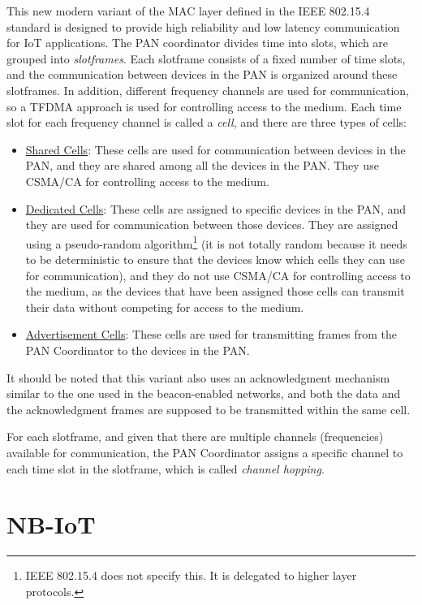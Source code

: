 This new modern variant of the MAC layer defined in the IEEE 802.15.4 standard is designed to provide high reliability and low latency communication for IoT applications. The PAN coordinator divides time into slots, which are grouped into \emph{slotframes}. Each slotframe consists of a fixed number of time slots, and the communication between devices in the PAN is organized around these slotframes. In addition, different frequency channels are used for communication, so a TFDMA approach is used for controlling access to the medium. Each time slot for each frequency channel is called a \emph{cell}, and there are three types of cells:
\begin{itemize}
    \item \ul{Shared Cells}: These cells are used for communication between devices in the PAN, and they are shared among all the devices in the PAN. They use CSMA/CA for controlling access to the medium.
    \item \ul{Dedicated Cells}: These cells are assigned to specific devices in the PAN, and they are used for communication between those devices. They are assigned using a pseudo-random algorithm\footnote{IEEE 802.15.4 does not specify this. It is delegated to higher layer protocols.} (it is not totally random because it needs to be deterministic to ensure that the devices know which cells they can use for communication), and they do not use CSMA/CA for controlling access to the medium, as the devices that have been assigned those cells can transmit their data without competing for access to the medium.
    \item \ul{Advertisement Cells}: These cells are used for transmitting frames from the PAN Coordinator to the devices in the PAN.
\end{itemize}

It should be noted that this variant also uses an acknowledgment mechanism similar to the one used in the beacon-enabled networks, and both the data and the acknowledgment frames are supposed to be transmitted within the same cell.


For each slotframe, and given that there are multiple channels (frequencies) available for communication, the PAN Coordinator assigns a specific channel to each time slot in the slotframe, which is called \emph{channel hopping}. 


\section{NB-IoT}

